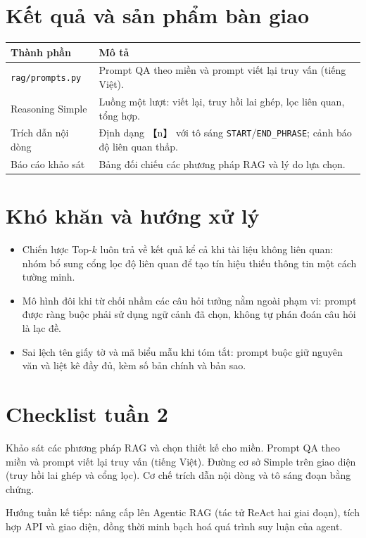 \documentclass[11pt]{article}
\begin{document}
\section{Kết quả và sản phẩm bàn giao}
\begin{table}[H]
\centering\small
\begin{tabular}{@{}lp{8.7cm}@{}}
\toprule
Thành phần & Mô tả \\
\midrule
\texttt{rag/prompts.py} & Prompt QA theo miền và prompt viết lại truy vấn (tiếng Việt). \\
Reasoning Simple & Luồng một lượt: viết lại, truy hồi lai ghép, lọc liên quan, tổng hợp. \\
Trích dẫn nội dòng & Định dạng 【n】 với tô sáng \texttt{START}/\texttt{END\_PHRASE}; cảnh báo độ liên quan thấp. \\
Báo cáo khảo sát & Bảng đối chiếu các phương pháp RAG và lý do lựa chọn. \\
\bottomrule
\end{tabular}
\end{table}

\section{Khó khăn và hướng xử lý}
\begin{itemize}
  \item Chiến lược Top-$k$ luôn trả về kết quả kể cả khi tài liệu không liên quan: nhóm bổ
        sung cổng lọc độ liên quan để tạo tín hiệu thiếu thông tin một cách tường minh.
  \item Mô hình đôi khi từ chối nhầm các câu hỏi tưởng nằm ngoài phạm vi: prompt được ràng
        buộc phải sử dụng ngữ cảnh đã chọn, không tự phán đoán câu hỏi là lạc đề.
  \item Sai lệch tên giấy tờ và mã biểu mẫu khi tóm tắt: prompt buộc giữ nguyên văn và liệt
        kê đầy đủ, kèm số bản chính và bản sao.
\end{itemize}

\section{Checklist tuần 2}
\begin{itemize}[label={}]
  \cbDone Khảo sát các phương pháp RAG và chọn thiết kế cho miền.
  \cbDone Prompt QA theo miền và prompt viết lại truy vấn (tiếng Việt).
  \cbDone Đường cơ sở Simple trên giao diện (truy hồi lai ghép và cổng lọc).
  \cbDone Cơ chế trích dẫn nội dòng và tô sáng đoạn bằng chứng.
\end{itemize}

\noindent Hướng tuần kế tiếp: nâng cấp lên Agentic RAG (tác tử ReAct hai giai đoạn), tích hợp
API và giao diện, đồng thời minh bạch hoá quá trình suy luận của agent.
\end{document}
